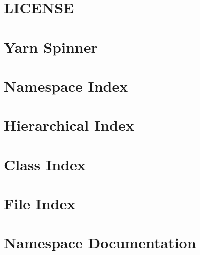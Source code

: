 \documentclass[twoside]{book}
\begin{document}
\chapter{L\-I\-C\-E\-N\-S\-E}
\label{d7/d7a/a00016}
\hypertarget{d7/d7a/a00016}{}

\chapter{Yarn Spinner}
\label{d1/d2b/a00018}
\hypertarget{d1/d2b/a00018}{}

\chapter{Namespace Index}

\chapter{Hierarchical Index}

\chapter{Class Index}

\chapter{File Index}

\chapter{Namespace Documentation}













\end{document}
